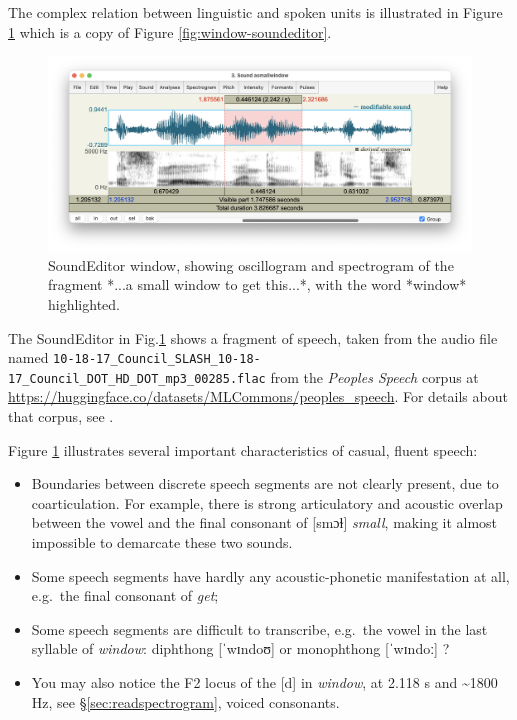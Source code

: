 \documentclass[
]{book}
\begin{document}
The complex relation between linguistic and spoken units is illustrated in Figure \ref{fig:window-soundeditor-second} which is a copy of Figure \ref{fig:window-soundeditor}.

\begin{figure}

{\centering \includegraphics{figures/asmallwindowtogetthis_SoundEditor2050124} 

}

\caption{SoundEditor window, showing oscillogram and spectrogram of the fragment *...a small window to get this...*, with the word *window* highlighted.}\label{fig:window-soundeditor-second}
\end{figure}

\label{box-windowsfile-details-second}
The SoundEditor in Fig.\ref{fig:window-soundeditor-second} shows a fragment of speech, taken from the audio file named \texttt{10-18-17\_Council\_SLASH\_10-18-17\_Council\_DOT\_HD\_DOT\_mp3\_00285.flac} from the \emph{Peoples Speech} corpus at \url{https://huggingface.co/datasets/MLCommons/peoples_speech}. For details about that corpus, see \citet{Galvez_Diamos_Ciro_Cerón_Achorn_Gopi_Kanter_Lam_Mazumder_Reddi_2021}.

Figure \ref{fig:window-soundeditor-second} illustrates several important characteristics of casual, fluent speech:

\begin{itemize}
\item
  Boundaries between discrete speech segments are not clearly present, due to coarticulation. For example, there is strong articulatory and acoustic overlap between the vowel and the final consonant of {[}smɔɫ{]} \emph{small}, making it almost impossible to demarcate these two sounds.
\item
  Some speech segments have hardly any acoustic-phonetic manifestation at all, e.g.~the final consonant of \emph{get};
\item
  Some speech segments are difficult to transcribe, e.g.~the vowel in the last syllable of \emph{window}: diphthong {[}ˈwɪndoʊ{]} or monophthong {[}ˈwɪndoː{]} ?
\item
  You may also notice the F2 locus of the {[}d{]} in \emph{window}, at 2.118 s and \textasciitilde1800 Hz, see §\ref{sec:readspectrogram}, voiced consonants.
\end{itemize}
\end{document}
